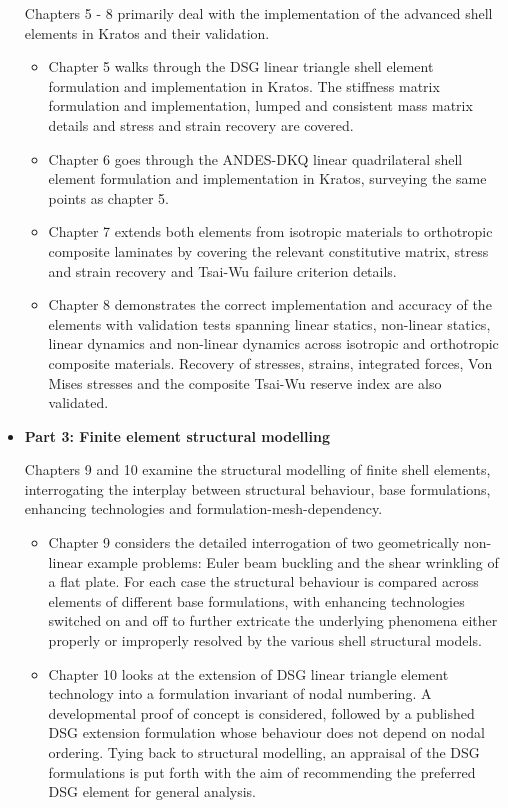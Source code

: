 \begin{itemize}
	Chapters 5 - 8 primarily deal with the implementation of the advanced shell elements in Kratos and their validation.
	\begin{itemize}
		\item Chapter 5 walks through the DSG linear triangle shell element formulation and implementation in Kratos. The stiffness matrix formulation and implementation, lumped and consistent mass matrix details and stress and strain recovery are covered.
		\item Chapter 6 goes through the ANDES-DKQ linear quadrilateral shell element formulation and implementation in Kratos, surveying the same points as chapter 5.
		\item Chapter 7 extends both elements from isotropic materials to orthotropic composite laminates by covering the relevant constitutive matrix, stress and strain recovery and Tsai-Wu failure criterion details.
		\item Chapter 8 demonstrates the correct implementation and accuracy of the elements with validation tests spanning linear statics, non-linear statics, linear dynamics and non-linear dynamics across isotropic and orthotropic composite materials. Recovery of stresses, strains, integrated forces, Von Mises stresses and the composite Tsai-Wu reserve index are also validated.
	\end{itemize}

	\item \textbf{Part 3: Finite element structural modelling}
	
	Chapters 9 and 10 examine the structural modelling of finite shell elements, interrogating the interplay between structural behaviour, base formulations, enhancing technologies and formulation-mesh-dependency.
	\begin{itemize}
		\item Chapter 9 considers the detailed interrogation of two geometrically non-linear example problems: Euler beam buckling and the shear wrinkling of a flat plate. For each case the structural behaviour is compared across elements of different base formulations, with enhancing technologies switched on and off to further extricate the underlying phenomena either properly or improperly resolved by the various shell structural models.
		\item Chapter 10 looks at the extension of DSG linear triangle element technology into a formulation invariant of nodal numbering. A developmental proof of concept is considered, followed by a published DSG extension formulation whose behaviour does not depend on nodal ordering. Tying back to structural modelling, an appraisal of the DSG formulations is put forth with the aim of recommending the preferred DSG element for general analysis.
	\end{itemize}
\end{itemize}


